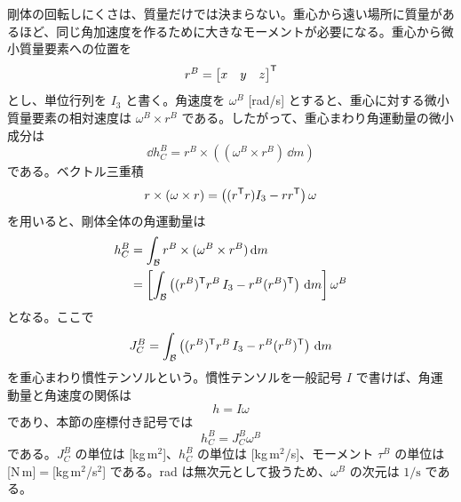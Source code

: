 剛体の回転しにくさは、質量だけでは決まらない。重心から遠い場所に質量があるほど、同じ角加速度を作るために大きなモーメントが必要になる。重心から微小質量要素への位置を
\begin{equation}
  r^B=
  \begin{bmatrix}
    x&y&z
  \end{bmatrix}^{\mathsf{T}}
\end{equation}
とし、単位行列を $I_3$ と書く。角速度を $\omega^B$ [rad/s] とすると、重心に対する微小質量要素の相対速度は $\omega^B\times r^B$ である。したがって、重心まわり角運動量の微小成分は
\begin{equation}
  \dd h_C^B
  =
  r^B\times\left((\omega^B\times r^B)\,\dd m\right)
\end{equation}
である。ベクトル三重積
\begin{equation}
  r\times(\omega\times r)
  =
  \left((r^{\mathsf{T}} r)I_3-rr^{\mathsf{T}}\right)\omega
\end{equation}
を用いると、剛体全体の角運動量は
\begin{align}
  h_C^B
  &=
  \int_{\mathcal{B}}
    r^B\times(\omega^B\times r^B)\,\mathrm{d} m\\
  &=
  \left[
  \int_{\mathcal{B}}
    \left((r^B)^{\mathsf{T}} r^B\,I_3-r^B(r^B)^{\mathsf{T}}\right)\,\mathrm{d} m
  \right]\omega^B
\end{align}
となる。ここで
\begin{equation}
  J_C^B
  =
  \int_{\mathcal{B}}
    \left((r^B)^{\mathsf{T}} r^B\,I_3-r^B(r^B)^{\mathsf{T}}\right)\,\mathrm{d} m
\end{equation}
を重心まわり慣性テンソルという。慣性テンソルを一般記号 $I$ で書けば、角運動量と角速度の関係は
\begin{equation}
  h=I\omega
\end{equation}
であり、本節の座標付き記号では
\begin{equation}
  h_C^B=J_C^B\omega^B
\end{equation}
である。$J_C^B$ の単位は [kg\,m$^2$]、$h_C^B$ の単位は [kg\,m$^2$/s]、モーメント $\tau^B$ の単位は [N\,m]$=$[kg\,m$^2$/s$^2$] である。rad は無次元として扱うため、$\omega^B$ の次元は $1/\mathrm{s}$ である。

